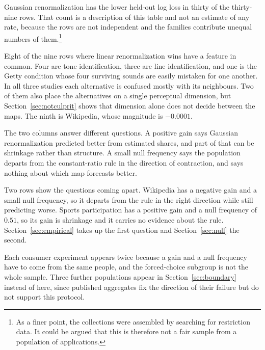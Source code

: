 \documentclass[11pt]{article}
\theoremstyle{italichead}
\begin{document}

Gaussian renormalization has the lower held-out log loss in thirty of the
thirty-nine rows. That count is a description of this table and not an estimate of any rate,
because the rows are not independent and the families contribute unequal numbers of
them.\setcounter{footnote}{3}\footnote{As a finer point, the collections were assembled by searching for restriction data.
It could be argued that this is therefore not a fair sample from a population of applications.}

Eight of the nine rows where linear renormalization wins have a feature in common. Four are
tone identification, three are line identification, and one is the Getty condition whose four
surviving sounds are easily mistaken for one another. In all three studies each alternative is
confused mostly with its neighbours. Two of them also place the alternatives on a single
perceptual dimension, but Section~\ref{sec:notculprit} shows that dimension alone does not decide
between the maps. The ninth is Wikipedia, whose magnitude is $-0.0001$.

The two columns answer different questions. A positive gain says Gaussian renormalization
predicted better from estimated shares, and part of that can be shrinkage rather than structure. A
small null frequency says the population departs from the constant-ratio rule in the direction of
contraction, and says nothing about which map forecasts better.

Two rows show the questions coming apart. Wikipedia has a negative gain and a small null
frequency, so it departs from the rule in the right direction while still predicting worse. Sports
participation has a positive gain and a null frequency of $0.51$, so its gain is shrinkage and it
carries no evidence about the rule. Section~\ref{sec:empirical} takes up the first question and
Section~\ref{sec:null} the second.

Each consumer experiment appears twice because a gain and a null frequency have to come from the
same people, and the forced-choice subgroup is not the whole sample. Three further populations
appear in Section~\ref{sec:boundary} instead of here, since published aggregates fix the direction
of their failure but do not support this protocol.
\end{document}
